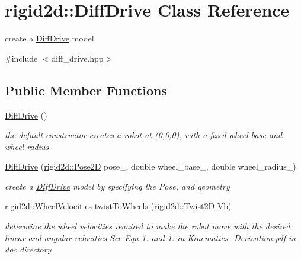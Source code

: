 \hypertarget{classrigid2d_1_1DiffDrive}{}\section{rigid2d\+:\+:Diff\+Drive Class Reference}
\label{classrigid2d_1_1DiffDrive}


create a \hyperlink{classrigid2d_1_1DiffDrive}{Diff\+Drive} model  




{\ttfamily \#include $<$diff\+\_\+drive.\+hpp$>$}

\subsection*{Public Member Functions}
\begin{DoxyCompactItemize}
\item 
\mbox{\label{classrigid2d_1_1DiffDrive_a2d646290b7a03d391a59e8a296fea30d}} 
\hyperlink{classrigid2d_1_1DiffDrive_a2d646290b7a03d391a59e8a296fea30d}{Diff\+Drive} ()
\begin{DoxyCompactList}\small\item\em the default constructor creates a robot at (0,0,0), with a fixed wheel base and wheel radius \end{DoxyCompactList}\item 
\hyperlink{classrigid2d_1_1DiffDrive_ab82f3b48c56ae6fa5ace50eccb5f70b2}{Diff\+Drive} (\hyperlink{structrigid2d_1_1Pose2D}{rigid2d\+::\+Pose2D} pose\+\_\+, double wheel\+\_\+base\+\_\+, double wheel\+\_\+radius\+\_\+)
\begin{DoxyCompactList}\small\item\em create a \hyperlink{classrigid2d_1_1DiffDrive}{Diff\+Drive} model by specifying the Pose, and geometry \end{DoxyCompactList}\item 
\hyperlink{structrigid2d_1_1WheelVelocities}{rigid2d\+::\+Wheel\+Velocities} \hyperlink{classrigid2d_1_1DiffDrive_ae9ca2df976d1fed87addd110e28a8eb1}{twist\+To\+Wheels} (\hyperlink{classrigid2d_1_1Twist2D}{rigid2d\+::\+Twist2D} Vb)
\begin{DoxyCompactList}\small\item\em determine the wheel velocities required to make the robot move with the desired linear and angular velocities See Eqn 1. and 1. in Kinematics\+\_\+\+Derivation.\+pdf in doc directory \end{DoxyCompactList}\item 

\end{DoxyCompactItemize}
